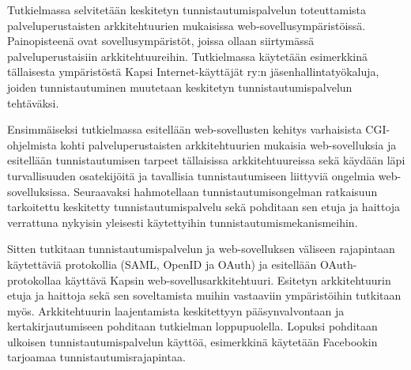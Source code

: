 Tutkielmassa selvitetään keskitetyn tunnistautumispalvelun toteuttamista palveluperustaisten arkkitehtuurien mukaisissa web-sovellusympäristöissä. Painopisteenä ovat sovellusympäristöt, joissa ollaan siirtymässä palveluperustaisiin arkkitehtuureihin. Tutkielmassa käytetään esimerkkinä tällaisesta ympäristöstä Kapsi Internet-käyttäjät ry:n jäsenhallintatyökaluja, joiden tunnistautuminen muutetaan keskitetyn tunnistautumispalvelun tehtäväksi.

Ensimmäiseksi tutkielmassa esitellään web-sovellusten kehitys varhaisista CGI-ohjelmista kohti palveluperustaisten arkkitehtuurien mukaisia web-sovelluksia ja esitellään tunnistautumisen tarpeet tällaisissa arkkitehtuureissa sekä käydään läpi turvallisuuden osatekijöitä ja tavallisia tunnistautumiseen liittyviä ongelmia web-sovelluksissa. Seuraavaksi hahmotellaan tunnistautumisongelman ratkaisuun tarkoitettu keskitetty tunnistautumispalvelu sekä pohditaan sen etuja ja haittoja verrattuna nykyisin yleisesti käytettyihin tunnistautumismekanismeihin.

Sitten tutkitaan tunnistautumispalvelun ja web-sovelluksen väliseen rajapintaan käytettäviä protokollia (SAML, OpenID ja OAuth) ja esitellään OAuth-protokollaa käyttävä Kapsin web-sovellusarkkitehtuuri. Esitetyn arkkitehtuurin etuja ja haittoja sekä sen soveltamista muihin vastaaviin ympäristöihin tutkitaan myös. Arkkitehtuurin laajentamista keskitettyyn pääsynvalvontaan ja kertakirjautumiseen pohditaan tutkielman loppupuolella. Lopuksi pohditaan ulkoisen tunnistautumispalvelun käyttöä, esimerkkinä käytetään Facebookin tarjoamaa tunnistautumisrajapintaa.